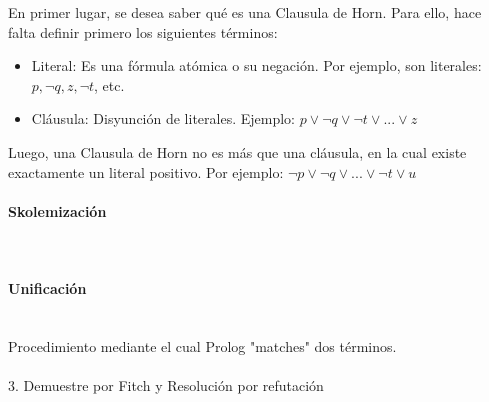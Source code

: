 \documentclass{article}
\begin{document}
En primer lugar, se desea saber qu\'e es una Clausula de Horn. Para ello, hace falta definir primero los siguientes t\'erminos:

\begin{itemize}

\item Literal: Es una f\'ormula at\'omica o su negaci\'on. Por ejemplo, son literales: $p, \neg q, z, \neg t$, etc.
\item Cl\'ausula: Disyunci\'on de literales. Ejemplo: $ p \lor \neg q \lor \neg t \lor ... \lor z $ 

\end{itemize}

Luego, una Clausula de Horn no es m\'as que una cl\'ausula, en la cual existe exactamente un literal positivo. Por ejemplo: $ \neg p \lor \neg q \lor ... \lor \neg t \lor u$ 

\paragraph{Skolemizaci\'on}\mbox{}\\





\paragraph{Unificaci\'on}\mbox{}\\

Procedimiento mediante el cual Prolog "matches" dos t\'erminos.


\paragraph{}

3. Demuestre por Fitch y Resoluci\'on por refutaci\'on
\end{document}
